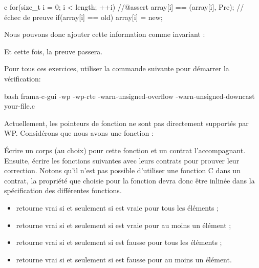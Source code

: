 \begin{CodeBlock}{c}
for(size_t i = 0; i < length; ++i){
    //@assert array[i] == \at(array[i], Pre); // échec de preuve
    if(array[i] == old) array[i] = new;
}
\end{CodeBlock}



Nous pouvons donc ajouter cette information comme invariant :






Et cette fois, la preuve passera.





Pour tous ces exercices, utiliser la commande suivante pour démarrer la vérification:

\begin{CodeBlock}{bash}
frama-c-gui -wp -wp-rte -warn-unsigned-overflow -warn-unsigned-downcast your-file.c
\end{CodeBlock}




Actuellement, les pointeurs de fonction ne sont pas directement supportés par WP.
Considérons que nous avons une fonction :





Écrire un corps (au choix) pour cette fonction et un contrat l'accompagnant.
Ensuite, écrire les fonctions suivantes avec leurs contrats pour prouver leur
correction. Notons qu'il n'est pas possible d'utiliser une fonction C dans un
contrat, la propriété que choisie pour la fonction 
devra donc être inlinée dans la spécification des différentes fonctions.

\begin{itemize}
\item {} retourne vrai si et seulement si 
  est vraie pour tous les éléments ;
\item {} retourne vrai si et seulement si 
  est vraie pour au moins un élément ;
\item {} retourne vrai si et seulement si 
  est fausse pour tous les éléments ;
\item {} retourne vrai si et seulement si 
  est fausse pour au moins un élément.
\end{itemize}

